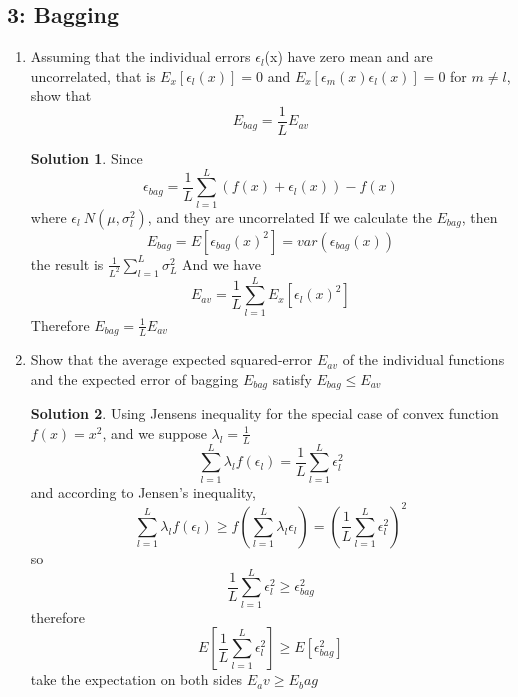 \documentclass[]{book}
\theoremstyle{definition}
\newtheorem*{soln}{Solution}
\begin{document}
\subsection*{3: Bagging }
	\begin{enumerate}
		\item Assuming that the individual errors $\epsilon_l$(x) have zero mean and are uncorrelated, that is $E_x[\epsilon_l (x)] = 0$ and $E_x[\epsilon_m (x)\epsilon_l (x)] = 0$ for $m \neq l $, show that
		$$ E_{bag} = \frac{1}{L} E_{av}$$
		\begin{soln}
			Since 
			$$\epsilon_{bag} = \frac{1}{L}\sum_{l=1}^{L}(f(x)+\epsilon_l(x)) - f(x)$$
			where $\epsilon_l ~ N(\mu,\sigma_l ^2)$, and they are uncorrelated 
			If we calculate the $ E_{bag}$, then
			$$E_{bag} = E[\epsilon_{bag}(x)^2] = var(\epsilon_{bag}(x))$$
			the result is $\frac{1}{L^2}\sum_{l=1}^{L} \sigma_L ^2$
			And we have
			$$E_{av} = \frac{1}{L}\sum_{l=1}^{L}E_x[\epsilon_l(x)^2]$$
			Therefore $E_{bag} = \frac{1}{L}E_{av}$
		\end{soln}
	\item  Show that the average expected squared-error $E_{av}$ of the individual functions and the expected error of bagging $E_{bag}$ satisfy $E_{bag} \leq E_{av}$
	\begin{soln}
		Using Jensens inequality for the special case of convex function $f(x) = x^2$, and we suppose $\lambda_l = \frac{1}{L}$
		$$\sum_{l =1}^{L}\lambda_l f(\epsilon_l) = \frac{1}{L}\sum_{l = 1}^{L}\epsilon_l^2$$
		and according to Jensen's inequality,
		$$\sum_{l =1}^{L}\lambda_l f(\epsilon_l) \geq f(\sum_{l =1}^{L}\lambda_l \epsilon_l) = (\frac{1}{L}\sum_{l = 1}^{L}\epsilon_l^2)^2$$
		so
		$$\frac{1}{L}\sum_{l = 1}^{L}\epsilon_l^2 \geq \epsilon_{bag}^2$$
		therefore
		$$E[\frac{1}{L}\sum_{l = 1}^{L}\epsilon_l^2] \geq E[\epsilon_{bag}^2]$$
		take the expectation on both sides $E_av \geq E_bag $
	\end{soln}
	\end{enumerate}
\end{document}
